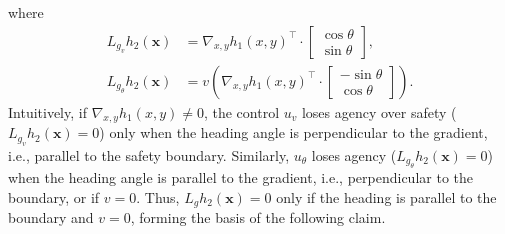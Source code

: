 \documentclass[letterpaper, 10 pt, conference]{ieeeconf}
\begin{document}
where 
\begin{align}
    L_{g_v}h_2(\mathbf{x}) &= \nabla_{x,y} h_1(x,y)^\top \cdot\begin{bmatrix}
        \cos\theta\\
        \sin\theta
    \end{bmatrix}\label{Lg_v_h},\\
    L_{g_\theta}h_2(\mathbf{x}) &= v\left(\nabla_{x,y} h_1(x,y)^\top \cdot \begin{bmatrix}
        -\sin\theta\\
        \cos\theta
    \end{bmatrix}\right)\label{Lg_theta_h}.
\end{align}
Intuitively, if $ \nabla_{x,y} h_1(x,y) \neq 0 $, the control $ u_v $ loses agency over safety ($ L_{g_v} h_2(\mathbf{x}) = 0 $) only when the heading angle is perpendicular to the gradient, i.e., parallel to the safety boundary. Similarly, $ u_\theta $ loses agency ($ L_{g_\theta} h_2(\mathbf{x}) = 0 $) when the heading angle is parallel to the gradient, i.e., perpendicular to the boundary, or if $ v = 0 $. Thus, $ L_g h_2(\mathbf{x}) = 0 $ only if the heading is parallel to the boundary and $ v = 0 $, forming the basis of the following claim.
\end{document}
